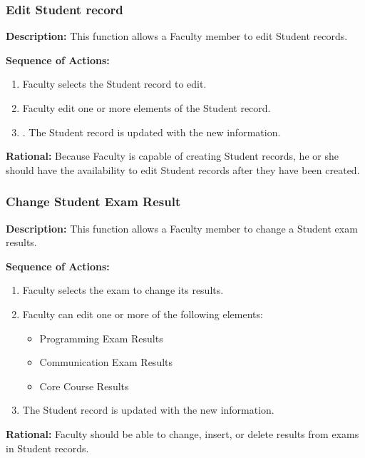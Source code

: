    \subsubsection{\large Edit Student record} 
   \begin{boxed} %
      \textbf{Description:}
      This function allows a Faculty member to edit Student records.
         
      \vspace{3mm}
         \textbf{Sequence of Actions:}
         \begin{enumerate}
               
            \item Faculty selects the Student record to edit.
            \item Faculty edit one or more elements of the Student record.
            \item. The Student record is updated with the new information.
      \end{enumerate}

         \textbf{Rational:}
         Because Faculty is capable of creating Student records, he or she
         should have the availability to edit Student records after they have
      been created.
   \end{boxed} %

   \subsubsection{\large Change Student Exam Result} 
   \begin{boxed} %
      \textbf{Description:}
      This function allows a Faculty member to change a Student exam
         results.
         
         \vspace{3mm}
         \textbf{Sequence of Actions:}
         \begin{enumerate}
               
            \item Faculty selects the exam to change its results.
            \item Faculty can edit one or more of the following elements:
            \begin{itemize}
               \item Programming Exam Results
               \item Communication Exam Results
               \item Core Course Results
            \end{itemize}
         \item The Student record is updated with the new information.
      \end{enumerate}

         \textbf{Rational:}
         Faculty should be able to change, insert, or delete results from exams
         in Student records.
   \end{boxed} %

